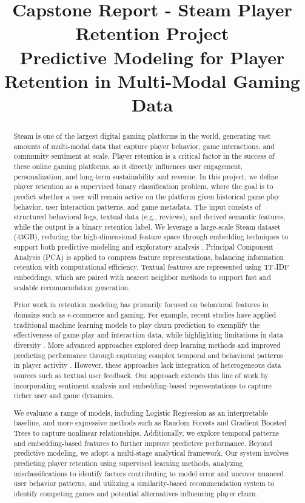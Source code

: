 \documentclass[conference]{IEEEtran}
\title{Capstone Report - Steam Player Retention Project \\[0.2em]
\large Predictive Modeling for Player Retention in Multi-Modal Gaming Data}
\author{
\IEEEauthorblockN{Jason Limfueco, Laura Ngo, Baixi Guo}
\IEEEauthorblockA{
University of California San Diego, Master of Data Science
}
}
\begin{document}
\maketitle

\begin{abstract}
Steam is one of the largest digital gaming platforms in the world, generating vast amounts of multi-modal data that capture player behavior, game interactions, and community sentiment at scale. Player retention is a critical factor in the success of these online gaming platforms, as it directly influences user engagement, personalization, and long-term sustainability and revenue. In this project, we define player retention as a supervised binary classification problem, where the goal is to predict whether a user will remain active on the platform given historical game play behavior, user interaction patterns, and game metadata. The input consists of structured behavioral logs, textual data (e.g., reviews), and derived semantic features, while the output is a binary retention label. We leverage a large-scale Steam dataset (43GB), reducing the high-dimensional feature space through embedding techniques to support both predictive modeling and exploratory analysis \cite{steam_dataset}. Principal Component Analysis (PCA) is applied to compress feature representations, balancing information retention with computational efficiency. Textual features are represented using TF-IDF embeddings, which are paired with nearest neighbor methods to support fast and scalable recommendation generation. 

Prior work in retention modeling has primarily focused on behavioral features in domains such as e-commerce and gaming. For example, recent studies have applied traditional machine learning models to play churn prediction to exemplify the effectiveness of game-play and interaction data, while highlighting limitations in data diversity \cite{peng2024churn}. More advanced approaches explored deep learning methods and improved predicting performance through capturing complex temporal and behavioral patterns in player activity \cite{hoang2025}. However, these approaches lack integration of heterogeneous data sources such as textual user feedback. Our approach extends this line of work by incorporating sentiment analysis and embedding-based representations to capture richer user and game dynamics. 

We evaluate a range of models, including Logistic Regression as an interpretable baseline, and more expressive methods such as Random Forests and Gradient Boosted Trees to capture nonlinear relationships. Additionally, we explore temporal patterns and embedding-based features to further improve predictive performance. Beyond predictive modeling, we adopt a multi-stage analytical framework. Our system involves predicting player retention using supervised learning methods, analyzing misclassifications to identify factors contributing to model error and uncover nuanced user behavior patterns, and utilizing a similarity-based recommendation system to identify competing games and potential alternatives influencing player churn. 


\end{abstract}
\end{document}
